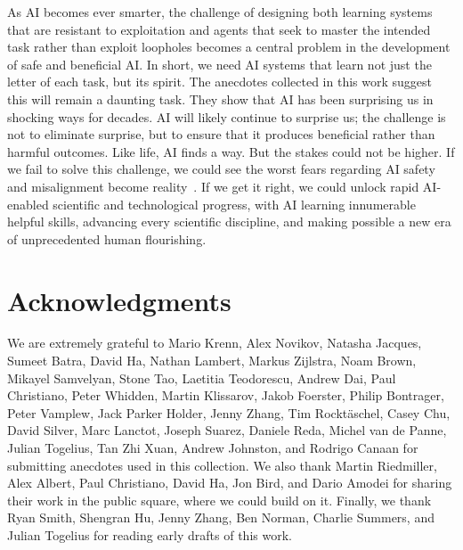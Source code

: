 \documentclass[10pt]{article}
\def\citep#1{}%
\begin{document}
As AI becomes ever smarter, the challenge of designing both learning systems that are resistant to exploitation and agents that seek to master the intended task rather than exploit loopholes becomes a central problem in the development of safe and beneficial AI.
In short, we need AI systems that learn not just the letter of each task, but its spirit. 
The anecdotes collected in this work suggest this will remain a daunting task. 
They show that AI has been surprising us in shocking ways for decades. 
AI will likely continue to surprise us; the challenge is not to eliminate surprise, but to ensure that it produces beneficial rather than harmful outcomes.
Like life, AI finds a way.
But the stakes could not be higher. 
If we fail to solve this challenge, we could see the worst fears regarding AI safety and misalignment become reality~\citep{Bengio2024risk, critch2023tasrataxonomyanalysissocietalscale}.
If we get it right, we could unlock rapid AI-enabled scientific and technological progress, with AI learning innumerable helpful skills, advancing every scientific discipline, and making possible a new era of unprecedented human flourishing.

\section*{Acknowledgments}

We are extremely grateful to
Mario Krenn,
Alex Novikov,
Natasha Jacques,
Sumeet Batra,
David Ha,
Nathan Lambert,
Markus Zijlstra,
Noam Brown,
Mikayel Samvelyan,
Stone Tao,
Laetitia Teodorescu,
Andrew Dai,
Paul Christiano,
Peter Whidden,
Martin Klissarov,
Jakob Foerster,
Philip Bontrager,
Peter Vamplew,
Jack Parker Holder,
Jenny Zhang,
Tim Rockt{\"a}schel,
Casey Chu,
David Silver,
Marc Lanctot,
Joseph Suarez,
Daniele Reda,
Michel van de Panne,
Julian Togelius,
Tan Zhi Xuan,
Andrew Johnston,
and Rodrigo Canaan
for submitting anecdotes used in this collection.
We also thank Martin Riedmiller,
Alex Albert,
Paul Christiano,
David Ha, 
Jon Bird,
and Dario Amodei for sharing their work in the public square, where we could build on it.
Finally, we thank Ryan Smith, Shengran Hu, Jenny Zhang, Ben Norman, Charlie Summers, and Julian Togelius for reading early drafts of this work.





\clearpage

\end{document}
